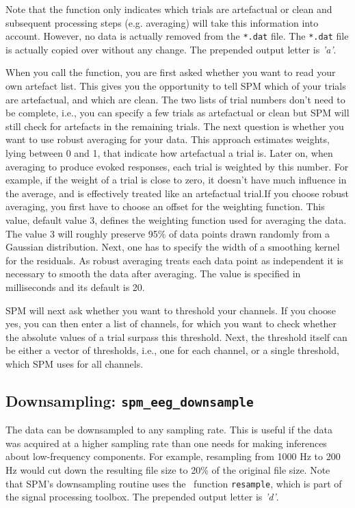 Note that the function only indicates which trials are artefactual or clean and subsequent processing steps (e.g. averaging) will take this information into account. However, no data is actually removed from the \texttt{*.dat} file. The \texttt{*.dat} file is actually copied over without any change. The prepended output letter is \textit{'a'}.

When you call the function, you are first asked whether you want to read your own artefact list. This gives you the opportunity to tell SPM which of your trials are artefactual, and which are clean. The two lists of trial numbers don't need to be complete, i.e., you can specify a few trials as artefactual or clean but SPM will still check for artefacts in the remaining trials. The next question is whether you want to use robust averaging for your data. This approach estimates weights, lying between 0 and 1, that indicate how artefactual a trial is. Later on, when averaging to produce evoked responses, each trial is weighted by this number. For example, if the weight of a trial is close to zero, it doesn't have much influence in the average, and is effectively treated like an artefactual trial.If you choose robust averaging, you first have to choose an offset for the weighting function. This value, default value 3, defines the weighting function used for averaging the data. The value 3 will roughly preserve 95\% of data points drawn randomly from a Gaussian distribution. Next, one has to specify the width of a smoothing kernel for the residuals. As robust averaging treats each data point as independent it is necessary to smooth the data after averaging. The value is specified in milliseconds and its default is 20.

SPM will next ask whether you want to threshold your channels. If you choose yes, you can then enter a list of channels, for which you want to check whether the absolute values of a trial surpass this threshold. Next, the threshold itself can be either a vector of thresholds, i.e., one for each channel, or a single threshold, which SPM uses for all channels.

\subsection{Downsampling: \texttt{spm\_eeg\_downsample}}
The data can be downsampled to any sampling rate. This is useful if the data was acquired at a higher sampling rate than one needs for making inferences about low-frequency components. For example, resampling from 1000 Hz to 200 Hz would cut down the resulting file size to 20\% of the original file size. Note that SPM's downsampling routine uses the \matlab\ function \texttt{resample}, which is part of the signal processing toolbox. The prepended output letter is \textit{'d'}.

